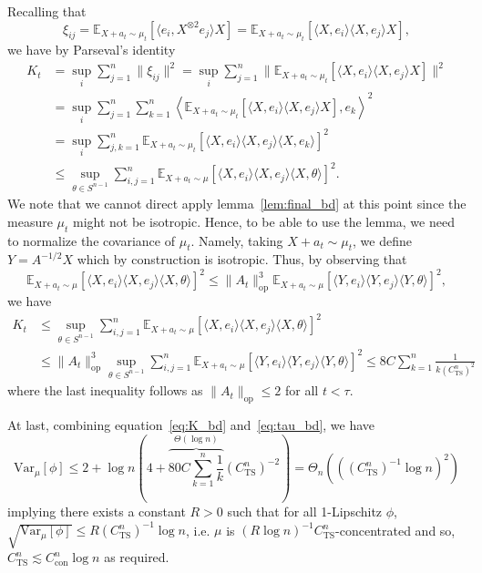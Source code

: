 Recalling that
\[\xi_{ij} = \mathbb{E}_{X + a_t \sim \mu_t}[\langle e_i, X^{\otimes 2} e_j\rangle X] = 
  \mathbb{E}_{X + a_t \sim \mu_t}[\langle X, e_i\rangle \langle X, e_j\rangle X],\]
we have by Parseval's identity 
\begin{align*}
  K_t & = \sup_i \sum_{j = 1}^n \|\xi_{ij}\|^2 
    = \sup_i \sum_{j = 1}^n \|\mathbb{E}_{X + a_t \sim \mu_t}[\langle X, e_i\rangle \langle X, e_j\rangle X]\|^2\\
  & = \sup_i \sum_{j = 1}^n \sum_{k = 1}^n 
    \left\langle \mathbb{E}_{X + a_t \sim \mu_t}[\langle X, e_i\rangle \langle X, e_j\rangle X], e_k\right\rangle^2\\
  & = \sup_i \sum_{j, k = 1}^n \mathbb{E}_{X + a_t \sim \mu_t}[\langle X, e_i\rangle \langle X, e_j\rangle \langle X, e_k\rangle]^2\\
  & \le \sup_{\theta \in S^{n - 1}}\sum_{i, j = 1}^n 
    \mathbb{E}_{X + a_t \sim \mu}[\langle X, e_i\rangle \langle X, e_j\rangle \langle X, \theta\rangle]^2.
\end{align*}
We note that we cannot direct apply lemma~\ref{lem:final_bd} at this point since the measure \(\mu_t\) 
might not be isotropic. Hence, to be able to use the lemma, we need to normalize the covariance of \(\mu_t\). 
Namely, taking \(X + a_t \sim \mu_t\), we define \(Y = A^{-1/2} X\) which by construction is isotropic. 
Thus, by observing that 
\[\mathbb{E}_{X + a_t \sim \mu}[\langle X, e_i\rangle \langle X, e_j\rangle \langle X, \theta\rangle]^2 
  \le \|A_t\|_{\text{op}}^3 \mathbb{E}_{X + a_t \sim \mu}[\langle Y, e_i\rangle \langle Y, e_j\rangle \langle Y, \theta\rangle]^2,\]
we have 
\begin{equation}\label{eq:K_bd}
  \begin{split}
    K_t & \le \sup_{\theta \in S^{n - 1}}\sum_{i, j = 1}^n 
        \mathbb{E}_{X + a_t \sim \mu}[\langle X, e_i\rangle \langle X, e_j\rangle \langle X, \theta\rangle]^2\\
      & \le \|A_t\|_{\text{op}}^3 \sup_{\theta \in S^{n - 1}}\sum_{i, j = 1}^n 
        \mathbb{E}_{X + a_t \sim \mu}[\langle Y, e_i\rangle \langle Y, e_j\rangle \langle Y, \theta\rangle]^2
        \le 8 C \sum_{k = 1}^n \frac{1}{k(C_{\text{TS}}^n)^2}
      \end{split}
\end{equation}
where the last inequality follows as \(\|A_t\|_{\text{op}} \le 2\) for all \(t < \tau\). 
    
At last, combining equation~\eqref{eq:K_bd} and~\eqref{eq:tau_bd}, we have
\[\text{Var}_\mu[\phi] \le 2 + \log n\left(4 + \overbrace{80 C \sum_{k = 1}^n \frac{1}{k}}^{\Theta(\log n)}(C_{\text{TS}}^n)^{-2}\right)
   = \Theta_n(((C_{\text{TS}}^n)^{-1} \log n)^2)\]
implying there exists a constant \(R > 0\) such that for all 1-Lipschitz \(\phi\), 
\(\sqrt{\text{Var}_\mu[\phi]} \le R (C_{\text{TS}}^n)^{-1} \log n\), i.e. \(\mu\) is 
\((R\log n)^{-1} C_{\text{TS}}^n\)-concentrated and so, \(C_{\text{TS}}^n \lesssim C_{\text{con}}^n \log n\)
as required.

